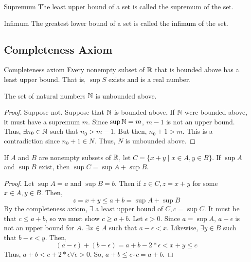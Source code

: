 \begin{definition}{Supremum}{}
    The least upper bound of a set is called the supremum of the set.
\end{definition}
\begin{definition}{Infimum}{}
    The greatest lower bound of a set is called the infimum of the set.
\end{definition}

\subsection{Completeness Axiom}
\begin{definition}{Completeness axiom}{}
    Every nonempty subset of $\mathbb{R}$ that is bounded above has a least upper bound. That is, $\sup S$ exists and is a real number.
\end{definition}

\begin{theorem}{}{}
    The set of natural numbers $\mathbb{N}$ is unbounded above.
\end{theorem}
\begin{proof}
    Suppose not. Suppose that $\mathbb{N}$ is bounded above. If $\mathbb{N}$ were bounded above, it must have a supremum $m$. Since $\sup \mathbb{N} = m$, $m - 1$ is not an upper bound. Thus, $\exists n_0 \in \mathbb{N}$ such that $n_0 > m - 1$. But then, $n_0 + 1 > m$. This is a contradiction since $n_0 + 1 \in N$. Thus, $N$ is unbounded above.
\end{proof}

\begin{theorem}{}{}
    If $A$ and $B$ are nonempty subsets of $\mathbb{R}$, let $C = \{x + y \mid x \in A, y \in B\}$. If $\sup A$ and $\sup B$ exist, then $\sup C = \sup A + \sup B$.
\end{theorem}
\begin{proof}
    Let $\sup A = a$ and $\sup B = b$. Then if $z \in C, z = x + y$ for some $x \in A, y \in B$. Then,
    $$ z = x + y \leq a + b = \sup A + \sup B $$
    By the completeness axiom, $\exists$ a least upper bound of $C, c = \sup C$. It must be that $c \leq a + b$, so we must show $c \geq a + b$. Let $\epsilon > 0$. Since $a = \sup A$, $a - \epsilon$ is not an upper bound for $A$. $\exists x \in A$ such that $a - \epsilon < x$. Likewise, $\exists y \in B$ such that $b - \epsilon < y$. Then,
    $$ (a - \epsilon) + (b - \epsilon) = a + b - 2 * \epsilon < x + y \leq c $$
    Thus, $a + b < c + 2 * \epsilon \forall \epsilon > 0$. So, $a + b \leq c \therefore c = a + b$.
\end{proof}